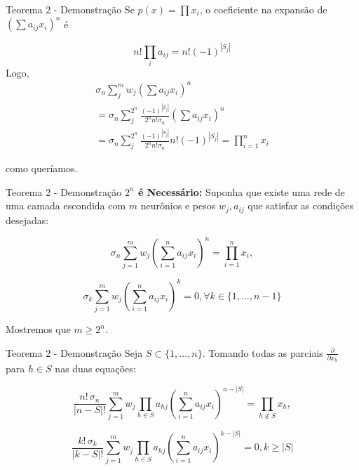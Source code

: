 \documentclass{beamer}
\begin{document}
\begin{frame}{Teorema 2 - Demonstração}
    \small
    Se $p(x) = \prod x_i$, o coeficiente na expansão de $\left(\sum a_{ij} x_i \right)^n$ é 

    \[
        n! \prod_i a_{ij} = n! (-1)^{|S_j|}
    \]
    \pause
    Logo,
    \begin{align*}
        \sigma_n \sum_j^m w_j \left(\sum a_{ij} x_i \right)^n \\
        = \sigma_n \sum_j^{2^n} \frac{(-1)^{|S_j|}}{2^n n! \sigma_n} \left(\sum a_{ij} x_i\right)^n  \\
        = \sigma_n \sum_j^{2^n} \frac{(-1)^{|S_j|}}{2^n n! \sigma_n} n! (-1)^{|S_j|} = \prod_{i=1}^n x_i
    \end{align*}
    
    como queríamos.
\end{frame}


\begin{frame}{Teorema 2 - Demonstração}
    \textbf{$2^n$ é Necessário:} Suponha que existe uma rede de uma camada escondida com $m$ neurônios e pesos $w_j, a_{ij}$ que satisfaz as condições desejadas:
        
    \begin{equation*} 
        \sigma_n \sum_{j=1}^{m} w_j \left( \sum_{i=1}^{n} a_{ij} x_i \right)^{n} = \prod_{i=1}^{n} x_i,
    \end{equation*}
    
    \begin{equation*}
        \sigma_k \sum_{j=1}^{m} w_j \left( \sum_{i=1}^{n} a_{ij} x_i \right)^{k} = 0, \forall k \in \{1, \dots, n-1\}
    \end{equation*}

    Mostremos que $m\geq 2^n$.
\end{frame}

\begin{frame}{Teorema 2 - Demonstração}
    Seja $S \subset \{1,\dots,n\}$. Tomando todas as parciais $\frac{\partial }{\partial x_h}$ para $h\in S$ nas duas equações:

    \begin{equation} 
        \label{eq:partial-prod}
        \frac{n! \, \sigma_n}{|n - S|!} \sum_{j=1}^{m} w_j \prod_{h \in S} a_{hj} 
        \left( \sum_{i=1}^{n} a_{ij} x_i \right)^{n - |S|} = \prod_{h \notin S} x_h,
    \end{equation}

    \begin{equation}
        \label{eq:partial-zero}
        \frac{k! \, \sigma_k}{|k - S|!} \sum_{j=1}^{m} w_j \prod_{h \in S} a_{hj} 
        \left( \sum_{i=1}^{n} a_{ij} x_i \right)^{k - |S|} = 0, k \geq |S|
    \end{equation}    

\end{frame}
\end{document}
